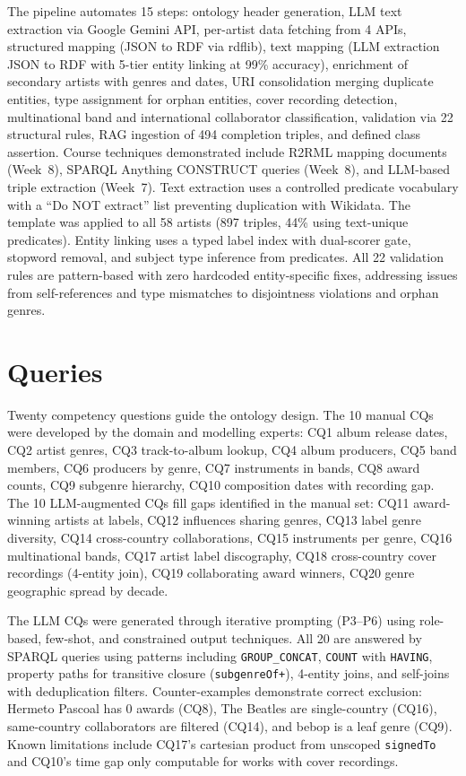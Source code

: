 \documentclass[11pt,a4paper]{article}
\begin{document}
The pipeline automates 15 steps: ontology header generation, LLM text extraction via Google Gemini API, per-artist data fetching from 4 APIs, structured mapping (JSON to RDF via rdflib), text mapping (LLM extraction JSON to RDF with 5-tier entity linking at 99\% accuracy), enrichment of secondary artists with genres and dates, URI consolidation merging duplicate entities, type assignment for orphan entities, cover recording detection, multinational band and international collaborator classification, validation via 22 structural rules, RAG ingestion of 494 completion triples, and defined class assertion. Course techniques demonstrated include R2RML mapping documents (Week~8), SPARQL Anything CONSTRUCT queries (Week~8), and LLM-based triple extraction (Week~7). Text extraction uses a controlled predicate vocabulary with a ``Do NOT extract'' list preventing duplication with Wikidata. The template was applied to all 58 artists (897 triples, 44\% using text-unique predicates). Entity linking uses a typed label index with dual-scorer gate, stopword removal, and subject type inference from predicates. All 22 validation rules are pattern-based with zero hardcoded entity-specific fixes, addressing issues from self-references and type mismatches to disjointness violations and orphan genres.

\section{Queries}

Twenty competency questions guide the ontology design. The 10 manual CQs were developed by the domain and modelling experts: CQ1 album release dates, CQ2 artist genres, CQ3 track-to-album lookup, CQ4 album producers, CQ5 band members, CQ6 producers by genre, CQ7 instruments in bands, CQ8 award counts, CQ9 subgenre hierarchy, CQ10 composition dates with recording gap. The 10 LLM-augmented CQs fill gaps identified in the manual set: CQ11 award-winning artists at labels, CQ12 influences sharing genres, CQ13 label genre diversity, CQ14 cross-country collaborations, CQ15 instruments per genre, CQ16 multinational bands, CQ17 artist label discography, CQ18 cross-country cover recordings (4-entity join), CQ19 collaborating award winners, CQ20 genre geographic spread by decade.

The LLM CQs were generated through iterative prompting (P3--P6) using role-based, few-shot, and constrained output techniques. All 20 are answered by SPARQL queries using patterns including \texttt{GROUP\_CONCAT}, \texttt{COUNT} with \texttt{HAVING}, property paths for transitive closure (\texttt{subgenreOf+}), 4-entity joins, and self-joins with deduplication filters. Counter-examples demonstrate correct exclusion: Hermeto Pascoal has 0 awards (CQ8), The Beatles are single-country (CQ16), same-country collaborators are filtered (CQ14), and bebop is a leaf genre (CQ9). Known limitations include CQ17's cartesian product from unscoped \texttt{signedTo} and CQ10's time gap only computable for works with cover recordings.
\end{document}
